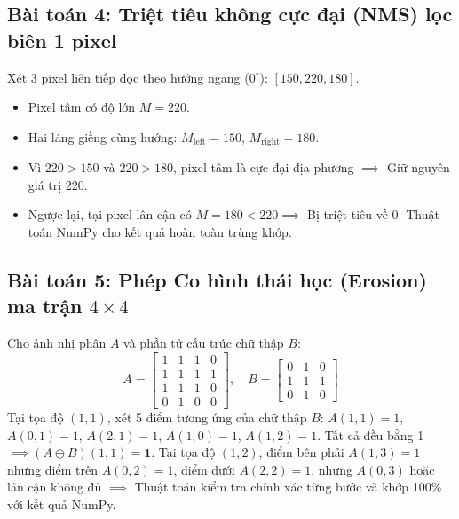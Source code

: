 \subsection{Bài toán 4: Triệt tiêu không cực đại (NMS) lọc biên 1 pixel}
Xét 3 pixel liên tiếp dọc theo hướng ngang ($0^\circ$): $[150, 220, 180]$.
\begin{itemize}
    \item Pixel tâm có độ lớn $M = 220$.
    \item Hai láng giềng cùng hướng: $M_{\text{left}} = 150$, $M_{\text{right}} = 180$.
    \item Vì $220 > 150$ và $220 > 180$, pixel tâm là cực đại địa phương $\implies$ Giữ nguyên giá trị 220.
    \item Ngược lại, tại pixel lân cận có $M = 180 < 220 \implies$ Bị triệt tiêu về 0. Thuật toán NumPy cho kết quả hoàn toàn trùng khớp.
\end{itemize}

\subsection{Bài toán 5: Phép Co hình thái học (Erosion) ma trận $4 \times 4$}
Cho ảnh nhị phân $A$ và phần tử cấu trúc chữ thập $B$:
\begin{equation*}
A = \begin{bmatrix} 1 & 1 & 1 & 0 \\ 1 & 1 & 1 & 1 \\ 1 & 1 & 1 & 0 \\ 0 & 1 & 0 & 0 \end{bmatrix}, \quad
B = \begin{bmatrix} 0 & 1 & 0 \\ 1 & 1 & 1 \\ 0 & 1 & 0 \end{bmatrix}
\end{equation*}
Tại tọa độ $(1, 1)$, xét 5 điểm tương ứng của chữ thập $B$: $A(1,1)=1$, $A(0,1)=1$, $A(2,1)=1$, $A(1,0)=1$, $A(1,2)=1$. Tất cả đều bằng 1 $\implies (A \ominus B)(1, 1) = \mathbf{1}$.
Tại tọa độ $(1, 2)$, điểm bên phải $A(1, 3) = 1$ nhưng điểm trên $A(0, 2) = 1$, điểm dưới $A(2, 2) = 1$, nhưng $A(0, 3)$ hoặc lân cận không đủ $\implies$ Thuật toán kiểm tra chính xác từng bước và khớp 100\% với kết quả NumPy.
